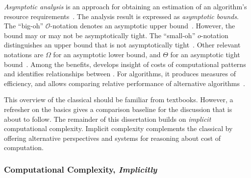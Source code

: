 \emph{Asymptotic analysis} is an approach for
obtaining an estimation of an algorithm's resource requirements~\cite[p.
267--277]{sipser2012}. The analysis result is expressed as
\emph{asymptotic bounds}. The \enquote{big-oh}
\(\mathcal{O}\)-notation  denotes an
asymptotic upper bound~\cite[p. 47]{cormen2009}. However, the
bound may or may not be asymptotically tight. The
\enquote{small-oh} \(o\)-notation distinguishes an upper bound
that is not asymptotically tight~\cite[p. 50]{cormen2009}. Other relevant
notations are \(\Omega\) for an asymptotic lower
bound, and \(\Theta\) for an asymptotic tight
bound~\cite[Sect. 3.1]{cormen2009}. Among the benefits,
 develops insight of costs of
computational patterns and identifies relationships between . For algorithms, it produces measures of efficiency, and allows
comparing relative performance of alternative algorithms~\cite{cormen2009}.

This overview of the classical  should be familiar from
textbooks. However, a refresher on the basics gives a comparison baseline for
the discussion that is about to follow. The remainder of this dissertation
builds on \emph{implicit} computational complexity. Implicit complexity
complements the classical  by offering alternative
perspectives and systems for reasoning about cost of computation.

\subsubsection{Computational Complexity, \emph{Implicitly}}

